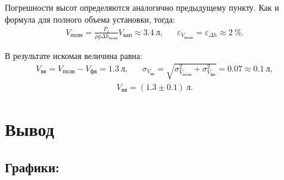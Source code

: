 \documentclass[11pt,a4paper]{article}
\begin{document}
\begin{enumerate}
  
  Погрешности высот определяются аналогично предыдущему пункту. Как и формула для полного объема установки, тогда:
  \begin{align}
    V_\text{полн} = \frac{P_1}{\rho g \Delta h_\text{полн}} V_{кап} \approx 3.4~л,&&
    \varepsilon_{V_{полн}} = \varepsilon_{\Delta h} \approx 2~\%.
  \end{align}
  
  В результате искомая величина равна:
  \begin{align}
    V_{вв} = V_{полн} - V_{фв} = 1.3~л, && \sigma_{V_{вв}} = \sqrt{\sigma_{V_{полн}}^2+ \sigma_{V_{фв}}^2} = 0.07 \approx 0.1 ~л,
  \end{align}
  \begin{align}
    V_{вв} = (1.3 \pm 0.1)~л.
  \end{align}
  
\end{enumerate}

\section*{Вывод}
\subsection*{\textbf{Графики:}}
\begin{figure}[h]
  \label{fig:graph1}
\end{figure}
\newpage
\begin{figure}[h]
  \label{fig:graph2}
\end{figure}
\end{document}
